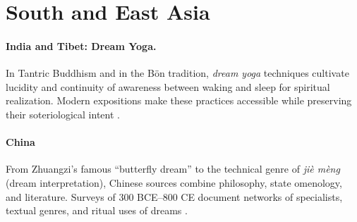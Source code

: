 \section{South and East Asia}\label{sec:asia}

\paragraph{India and Tibet: Dream Yoga.}
In Tantric Buddhism and in the Bön tradition, \textit{dream yoga} techniques cultivate lucidity and continuity of awareness between waking and sleep for spiritual realization.  
Modern expositions make these practices accessible while preserving their soteriological intent \citep{wangyal2001tibetan,wallace2012dreaming}.

\paragraph{China}
From Zhuangzi’s famous “butterfly dream” to the technical genre of \textit{jiè mèng} (dream interpretation), Chinese sources combine philosophy, state omenology, and literature.  
Surveys of 300 BCE–800 CE document networks of specialists, textual genres, and ritual uses of dreams \citep{campany2003dreamscape}.